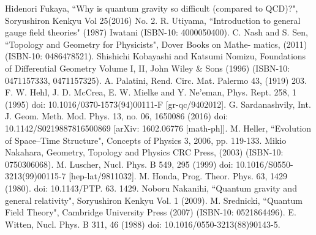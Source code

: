 \documentclass{article}
\begin{document}
\begin{thebibliography}{99}
Hidenori Fukaya, ``Why is quantum gravity so difficult (compared to QCD)?", Soryushiron Kenkyu Vol 25(2016) No. 2.
R. Utiyama, ``Introduction to general gauge field theories" (1987) Iwatani (ISBN-10:
4000050400).
C. Nash and S. Sen, ``Topology and Geometry for Physicists", Dover Books on Mathe-
matics, (2011) (ISBN-10: 0486478521).
Shishichi Kobayashi and Katsumi Nomizu, Foundations of Differential Geometry Volume I, II, John Wiley \& Sons (1996) (ISBN-10: 0471157333, 0471157325).
A. Palatini, Rend. Circ. Mat. Palermo 43, (1919) 203.
F. W. Hehl, J. D. McCrea, E. W. Mielke and Y. Ne'eman, Phys. Rept. 258, 1 (1995) doi: 10.1016/0370-1573(94)00111-F [gr-qc/9402012].
G. Sardanashvily, Int. J. Geom. Meth. Mod. Phys. 13, no. 06, 1650086 (2016) doi: 10.1142/S0219887816500869 [arXiv: 1602.06776 [math-ph]].
M. Heller, ``Evolution of Space--Time Structure", Concepts of Physics 3, 2006, pp. 119-133.
Mikio Nakahara, Geometry, Topology and Physics CRC Press, (2003) (ISBN-10: 0750306068).
M. Luscher, Nucl. Phys. B 549, 295 (1999) doi: 10.1016/S0550-3213(99)00115-7 [hep-lat/9811032].
M. Honda, Prog. Theor. Phys. 63, 1429 (1980). doi: 10.1143/PTP. 63. 1429.
Noboru Nakanihi, ``Quantum gravity and general relativity", Soryushiron Kenkyu Vol. 1 (2009).
M. Srednicki, ``Quantum Field Theory", Cambridge University Press (2007) (ISBN-10: 0521864496).
E. Witten, Nucl. Phys. B 311, 46 (1988) doi: 10.1016/0550-3213(88)90143-5.
\end{thebibliography}
\end{document}
